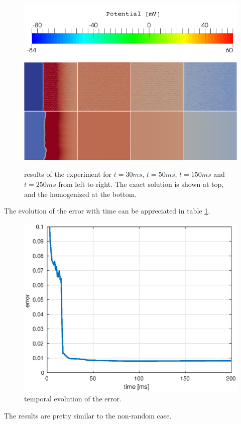 \documentclass[letterpaper]{article} 			     	%
\begin{document}
\begin{figure}[H]
\centering
\includegraphics[height = 1.5 cm]{fig/numerical_example_mde+min_exp1_colourbar}
\includegraphics[height = 7 cm]{fig/Numerical_Experiments/ex4/results} 
\caption{ results of the experiment for $t = 30 ms$, $t = 50 ms$, $t = 150 ms$ and $t = 250 ms$ from left to right. The exact solution is shown at top, and the homogenized at the bottom. }
\end{figure}

The evolution of the error with time can be appreciated in table \ref{fig:ex4_error_L2}.

\begin{figure}[H]
\centering
\includegraphics[height = 5 cm]{fig/Numerical_Experiments/ex4/error_L2.eps}
\caption{temporal evolution of the error.}
\label{fig:ex4_error_L2}
\end{figure}

The results are pretty similar to the non-random case. 
 
\end{document}
